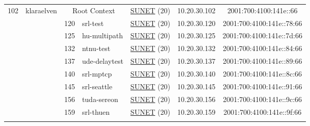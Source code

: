 \begin{small}
\begin{center}
\begin{longtable}{|c|c|c|c|c|c|c|c|}
 \multirow{14}{*}{\tiny{102}} & \multicolumn{1}{|l|}{\multirow{14}{*}{\tiny{klaraelven}}} & \multicolumn{2}{|c|}{\tiny{Root Context}} & \multicolumn{2}{|c|}{\tiny{\href{http://www.sunet.se}{SUNET} (20)}} & \tiny{10.20.30.102} & \tiny{2001:700:4100:141e::66} \\* \cline{3-3}\cline{4-4}\cline{5-5}\cline{6-6}\cline{7-7}\cline{8-8}
  &  & \tiny{120} & \multicolumn{1}{|l|}{\tiny{srl-test}} & \multicolumn{2}{|c|}{\tiny{\href{http://www.sunet.se}{SUNET} (20)}} & \tiny{10.20.30.120} & \tiny{2001:700:4100:141e::78:66} \\* \cline{3-3}\cline{4-4}\cline{5-5}\cline{6-6}\cline{7-7}\cline{8-8}
  &  & \tiny{125} & \multicolumn{1}{|l|}{\tiny{hu-multipath}} & \multicolumn{2}{|c|}{\tiny{\href{http://www.sunet.se}{SUNET} (20)}} & \tiny{10.20.30.125} & \tiny{2001:700:4100:141e::7d:66} \\* \cline{3-3}\cline{4-4}\cline{5-5}\cline{6-6}\cline{7-7}\cline{8-8}
  &  & \tiny{132} & \multicolumn{1}{|l|}{\tiny{ntnu-test}} & \multicolumn{2}{|c|}{\tiny{\href{http://www.sunet.se}{SUNET} (20)}} & \tiny{10.20.30.132} & \tiny{2001:700:4100:141e::84:66} \\* \cline{3-3}\cline{4-4}\cline{5-5}\cline{6-6}\cline{7-7}\cline{8-8}
  &  & \tiny{137} & \multicolumn{1}{|l|}{\tiny{ude-delaytest}} & \multicolumn{2}{|c|}{\tiny{\href{http://www.sunet.se}{SUNET} (20)}} & \tiny{10.20.30.137} & \tiny{2001:700:4100:141e::89:66} \\* \cline{3-3}\cline{4-4}\cline{5-5}\cline{6-6}\cline{7-7}\cline{8-8}
  &  & \tiny{140} & \multicolumn{1}{|l|}{\tiny{srl-mptcp}} & \multicolumn{2}{|c|}{\tiny{\href{http://www.sunet.se}{SUNET} (20)}} & \tiny{10.20.30.140} & \tiny{2001:700:4100:141e::8c:66} \\* \cline{3-3}\cline{4-4}\cline{5-5}\cline{6-6}\cline{7-7}\cline{8-8}
  &  & \tiny{145} & \multicolumn{1}{|l|}{\tiny{srl-seattle}} & \multicolumn{2}{|c|}{\tiny{\href{http://www.sunet.se}{SUNET} (20)}} & \tiny{10.20.30.145} & \tiny{2001:700:4100:141e::91:66} \\* \cline{3-3}\cline{4-4}\cline{5-5}\cline{6-6}\cline{7-7}\cline{8-8}
  &  & \tiny{156} & \multicolumn{1}{|l|}{\tiny{tuda-sereon}} & \multicolumn{2}{|c|}{\tiny{\href{http://www.sunet.se}{SUNET} (20)}} & \tiny{10.20.30.156} & \tiny{2001:700:4100:141e::9c:66} \\* \cline{3-3}\cline{4-4}\cline{5-5}\cline{6-6}\cline{7-7}\cline{8-8}
  &  & \tiny{159} & \multicolumn{1}{|l|}{\tiny{srl-thuen}} & \multicolumn{2}{|c|}{\tiny{\href{http://www.sunet.se}{SUNET} (20)}} & \tiny{10.20.30.159} & \tiny{2001:700:4100:141e::9f:66} \\* \cline{3-3}\cline{4-4}\cline{5-5}\cline{6-6}\cline{7-7}\cline{8-8}

\end{longtable}
\end{center}
\end{small}

